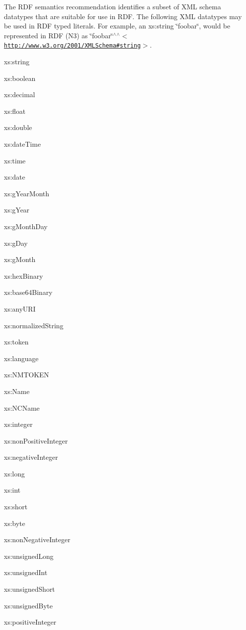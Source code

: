 The RDF semantics recommendation identifies a subset of XML schema datatypes that are suitable for use in RDF. The following XML datatypes may be used in RDF typed literals. For example, an xs:string \char`\"{}foobar\char`\"{}, would be represented in RDF (N3) as \char`\"{}foobar\char`\"{}$^\wedge$$^\wedge$$<$\href{http://www.w3.org/2001/XMLSchema#string}{\tt http://www.w3.org/2001/XMLSchema\#string}$>$.


\begin{DoxyItemize}
\item xs:string
\item xs:boolean
\item xs:decimal
\item xs:float
\item xs:double
\item xs:dateTime
\item xs:time
\item xs:date
\item xs:gYearMonth
\item xs:gYear
\item xs:gMonthDay
\item xs:gDay
\item xs:gMonth
\item xs:hexBinary
\item xs:base64Binary
\item xs:anyURI
\item xs:normalizedString
\item xs:token
\item xs:language
\item xs:NMTOKEN
\item xs:Name
\item xs:NCName
\item xs:integer
\item xs:nonPositiveInteger
\item xs:negativeInteger
\item xs:long
\item xs:int
\item xs:short
\item xs:byte
\item xs:nonNegativeInteger
\item xs:unsignedLong
\item xs:unsignedInt
\item xs:unsignedShort
\item xs:unsignedByte
\item xs:positiveInteger
\end{DoxyItemize}

